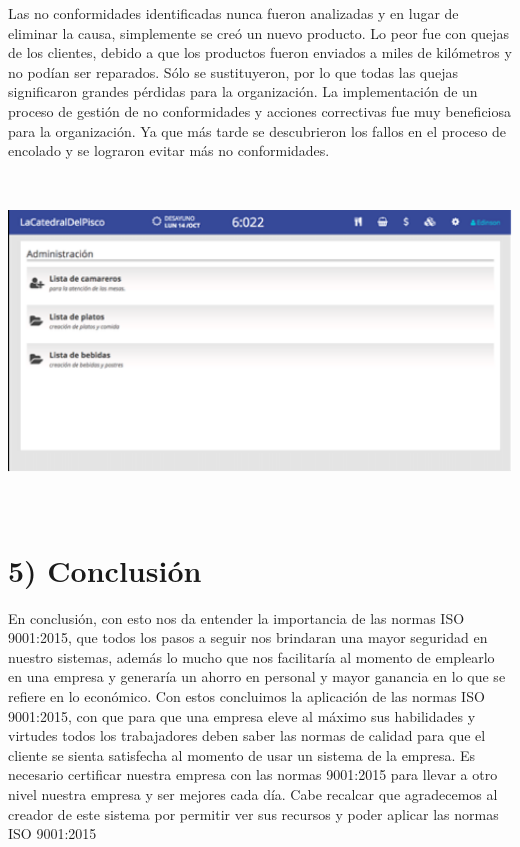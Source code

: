 \documentclass{article} %
\begin{document}
\noindent Las no conformidades identificadas nunca fueron analizadas y en lugar de eliminar la causa, simplemente se cre\'{o} un nuevo producto. Lo peor fue con quejas de los clientes, debido a que los productos fueron enviados a miles de kil\'{o}metros y no pod\'{i}an ser reparados. S\'{o}lo se sustituyeron, por lo que todas las quejas significaron grandes p\'{e}rdidas para la organizaci\'{o}n. La implementaci\'{o}n de un proceso de gesti\'{o}n de no conformidades y acciones correctivas fue muy beneficiosa para la organizaci\'{o}n. Ya que m\'{a}s tarde se descubrieron los fallos en el proceso de encolado y se lograron evitar m\'{a}s no conformidades.

\noindent \includegraphics*[width=6.66in, height=3.46in, keepaspectratio=false]{image8}

\noindent 

\noindent 

\noindent 

\noindent 

\noindent 

\noindent 


\section{5) Conclusi\'{o}n}

\noindent En conclusi\'{o}n, con esto nos da entender la importancia de las normas ISO 9001:2015, que todos los pasos a seguir nos brindaran una mayor seguridad en nuestro sistemas, adem\'{a}s lo mucho que nos facilitar\'{i}a al momento de emplearlo en una empresa y generar\'{i}a un ahorro en personal y mayor ganancia en lo que se refiere en lo econ\'{o}mico. Con estos concluimos la aplicaci\'{o}n de las normas ISO 9001:2015, con que para que una empresa eleve al m\'{a}ximo sus habilidades y virtudes todos los trabajadores deben saber las normas de calidad para que el cliente se sienta satisfecha al momento de usar un sistema de la empresa. Es necesario certificar nuestra empresa con las normas 9001:2015 para llevar a otro nivel nuestra empresa y ser mejores cada d\'{i}a. Cabe recalcar que agradecemos al creador de este sistema por permitir ver sus recursos y poder aplicar las normas ISO 9001:2015
\end{document}
